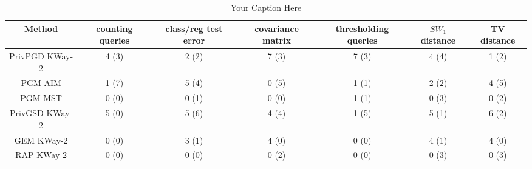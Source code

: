 \begin{table}[t!]
\centering
\begin{tabular}{ccccccc}
\toprule
Method & counting queries & class/reg test error & covariance matrix & thresholding queries & $SW_1$ distance & TV distance \\
\midrule
 PrivPGD KWay-2 & 4 (3) & 2 (2) & 7 (3) & 7 (3) & 4 (4) & 1 (2) \\
 PGM AIM & 1 (7) & 5 (4) & 0 (5) & 1 (1) & 2 (2) & 4 (5) \\
 PGM MST & 0 (0) & 0 (1) & 0 (0) & 1 (1) & 0 (3) & 0 (2) \\
 PrivGSD KWay-2 & 5 (0) & 5 (6) & 4 (4) & 1 (5) & 5 (1) & 6 (2) \\
 GEM KWay-2 & 0 (0) & 3 (1) & 4 (0) & 0 (0) & 4 (1) & 4 (0) \\
 RAP  KWay-2 & 0 (0) & 0 (0) & 0 (2) & 0 (0) & 0 (3) & 0 (3) \\
\bottomrule
\end{tabular}
\caption{Your Caption Here}
\label{tab:your_label}
\end{table}